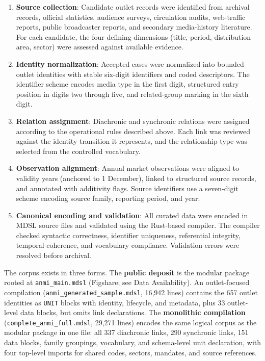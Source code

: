 \documentclass[11pt]{article}
\begin{document}
\begin{enumerate}
\item \textbf{Source collection}: Candidate outlet records were identified from archival records, official statistics, audience surveys, circulation audits, web-traffic reports, public broadcaster reports, and secondary media-history literature. For each candidate, the four defining dimensions (title, period, distribution area, sector) were assessed against available evidence.

\item \textbf{Identity normalization}: Accepted cases were normalized into bounded outlet identities with stable six-digit identifiers and coded descriptors. The identifier scheme encodes media type in the first digit, structured entry position in digits two through five, and related-group marking in the sixth digit.

\item \textbf{Relation assignment}: Diachronic and synchronic relations were assigned according to the operational rules described above. Each link was reviewed against the identity transition it represents, and the relationship type was selected from the controlled vocabulary.

\item \textbf{Observation alignment}: Annual market observations were aligned to validity years (anchored to 1 December), linked to structured source records, and annotated with additivity flags. Source identifiers use a seven-digit scheme encoding source family, reporting period, and year.

\item \textbf{Canonical encoding and validation}: All curated data were encoded in MDSL source files and validated using the Rust-based compiler. The compiler checked syntactic correctness, identifier uniqueness, referential integrity, temporal coherence, and vocabulary compliance. Validation errors were resolved before archival.
\end{enumerate}

The corpus exists in three forms. The \textbf{public deposit} is the modular package rooted at \texttt{anmi\_main.mdsl} (Figshare; see Data Availability). An outlet-focused compilation (\texttt{anmi\_\allowbreak generated\_\allowbreak sample.mdsl}, 16{,}942 lines) contains the 657 outlet identities as \texttt{UNIT} blocks with identity, lifecycle, and metadata, plus 33 outlet-level data blocks, but omits link declarations. The \textbf{monolithic compilation} (\texttt{complete\_\allowbreak anmi\_\allowbreak full.mdsl}, 29{,}271 lines) encodes the same logical corpus as the modular package in one file: all 337 diachronic links, 290 synchronic links, 151 data blocks, family groupings, vocabulary, and schema-level unit declaration, with four top-level imports for shared codes, sectors, mandates, and source references.
\end{document}
